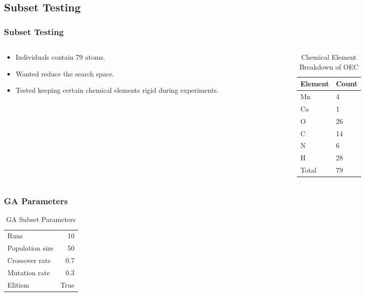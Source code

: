 \documentclass[10pt]{beamer}
\begin{document}
\subsection{Subset Testing}

\begin{frame}
	\frametitle{Subset Testing}

	\begin{columns}[T]
		\begin{column}{.5\textwidth}
			\begin{itemize}
				\item Individuals contain 79 atoms.
				\item Wanted reduce the search space.
				\item Tested keeping certain chemical elements rigid during experiments.
			\end{itemize}
		\end{column}
		\begin{column}{.5\textwidth}
			\begin{table}
				\caption{Chemical Element Breakdown of OEC}
				\begin{tabular}{ | l | l | }
				  \hline
					Element & Count \\ \hline
					Mn & 4 \\ \hline
					Ca & 1 \\ \hline
					O & 26 \\ \hline
					C & 14 \\ \hline
					N & 6 \\ \hline
					H & 28 \\ \hline
					Total & 79 \\ \hline
				\end{tabular}
			\end{table}
		\end{column}
	\end{columns}

\end{frame}

\begin{frame}
	\frametitle{GA Parameters}

	\begin{table}
		\caption{GA Subset Parameters}
		\begin{tabular}{ l r }
		  \hline
			Runs & 10 \\
			Population size & 50 \\
			Crossover rate & 0.7 \\
			Mutation rate & 0.3 \\
			Elitism & True \\
		  \hline
		\end{tabular}
	\end{table}

\end{frame}
\end{document}
